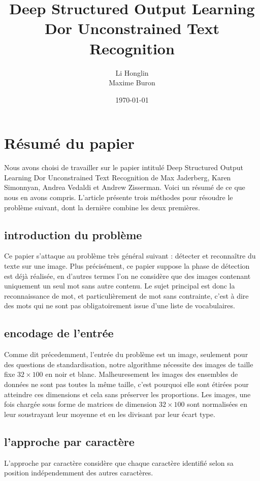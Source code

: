 \documentclass{article}
\author{Li Honglin \\Maxime Buron}
\date{\today}
\title{Deep Structured Output Learning Dor Unconstrained Text Recognition}
\begin{document}
\maketitle
\tableofcontents
\section{Résumé du papier}
Nous avons choisi de travailler sur le papier intitulé Deep Structured Output Learning Dor Unconstrained Text Recognition de Max Jaderberg, Karen Simonnyan, Andrea Vedaldi et Andrew Zisserman. Voici un résumé de ce que nous en avons compris. L'article présente trois méthodes pour résoudre le problème suivant, dont la dernière combine les deux premières.
\subsection{introduction du problème}
Ce papier s'attaque au problème très général suivant : détecter et reconnaître du texte sur une image. Plus précisément, ce papier suppose la phase de détection est déjà réalisée, en d'autres termes l'on ne considère que des images contenant uniquement un seul mot sans autre contenu. Le sujet principal est donc la reconnaissance de mot, et particulièrement de mot sans contrainte, c'est à dire des mots qui ne sont pas obligatoirement issue d'une liste de vocabulaires.

\subsection{encodage de l'entrée}
Comme dit précedemment, l'entrée du problème est un image, seulement pour des questions de standardisation, notre algorithme nécessite des images de taille fixe $32\times100$ en noir et blanc. Malheuresement les images des ensembles de données ne sont pas toutes la même taille, c'est pourquoi elle sont étirées pour atteindre ces dimensions et cela sans préserver les proportions. Les images, une fois chargée sous forme de matrices de dimension $32 \times 100$ sont normalisées en leur soustrayant leur moyenne et en les divisant par leur écart type. 

\subsection{l'approche par caractère}
L'approche par caractère considère que chaque caractère identifié selon sa position indépendemment des autres caractères. 
\end{document}
